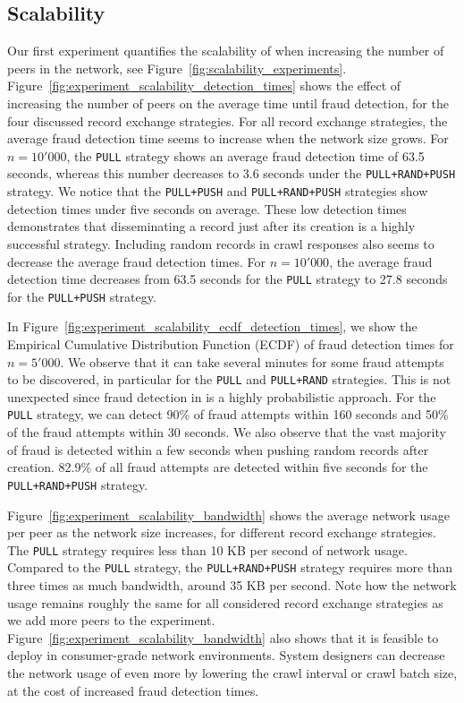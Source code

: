 \subsection{Scalability}
\label{sec:fraud_detection_experiment}
Our first experiment quantifies the scalability of \TrustChain{} when increasing the number of peers in the network, see Figure~\ref{fig:scalability_experiments}.
Figure~\ref{fig:experiment_scalability_detection_times} shows the effect of increasing the number of peers on the average time until fraud detection, for the four discussed record exchange strategies.
For all record exchange strategies, the average fraud detection time seems to increase when the network size grows.
For $ n = 10'000 $, the \texttt{PULL} strategy shows an average fraud detection time of 63.5 seconds, whereas this number decreases to 3.6 seconds under the \texttt{PULL+RAND+PUSH} strategy.
We notice that the \texttt{PULL+PUSH} and \texttt{PULL+RAND+PUSH} strategies show detection times under five seconds on average.
These low detection times demonstrates that disseminating a record just after its creation is a highly successful strategy.
Including random records in crawl responses also seems to decrease the average fraud detection times.
For $ n = 10'000 $, the average fraud detection time decreases from 63.5 seconds for the \texttt{PULL} strategy to 27.8 seconds for the \texttt{PULL+PUSH} strategy.

In Figure~\ref{fig:experiment_scalability_ecdf_detection_times}, we show the Empirical Cumulative Distribution Function (ECDF) of fraud detection times for $ n = 5'000 $.
We observe that it can take several minutes for some fraud attempts to be discovered, in particular for the \texttt{PULL} and \texttt{PULL+RAND} strategies.
This is not unexpected since fraud detection in \TrustChain{} is a highly probabilistic approach.
For the \texttt{PULL} strategy, we can detect 90\% of fraud attempts within 160 seconds and 50\% of the fraud attempts within 30 seconds.
We also observe that the vast majority of fraud is detected within a few seconds when pushing random records after creation.
82.9\% of all fraud attempts are detected within five seconds for the \texttt{PULL+RAND+PUSH} strategy.

Figure~\ref{fig:experiment_scalability_bandwidth} shows the average network usage per peer as the network size increases, for different record exchange strategies.
The \texttt{PULL} strategy requires less than 10 KB per second of network usage.
Compared to the \texttt{PULL} strategy, the \texttt{PULL+RAND+PUSH} strategy requires more than three times as much bandwidth, around 35 KB per second.
Note how the network usage remains roughly the same for all considered record exchange strategies as we add more peers to the experiment.
Figure~\ref{fig:experiment_scalability_bandwidth} also shows that it is feasible to deploy \TrustChain{} in consumer-grade network environments.
System designers can decrease the network usage of \TrustChain{} even more by lowering the crawl interval or crawl batch size, at the cost of increased fraud detection times.

